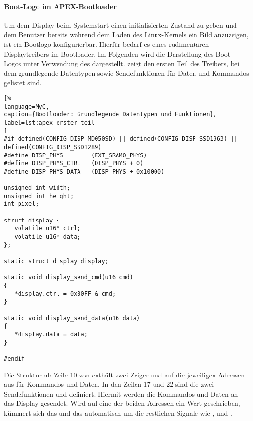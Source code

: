 \paragraph{Boot-Logo im APEX-Bootloader}
\label{cha:bootloader}
Um dem Display beim Systemstart einen initialisierten Zustand zu geben und dem Benutzer bereits während dem Laden des Linux-Kernels ein Bild anzuzeigen, ist ein Bootlogo konfigurierbar. Hierfür bedarf es eines rudimentären Displaytreibers im Bootloader. Im Folgenden wird die Darstellung des Boot-Logos unter Verwendung des  dargestellt.  zeigt den ersten Teil des Treibers, bei dem grundlegende Datentypen sowie Sendefunktionen für Daten und Kommandos gelistet sind. 

\begin{lstlisting}[%
language=MyC,
caption={Bootloader: Grundlegende Datentypen und Funktionen},
label=lst:apex_erster_teil
]
#if defined(CONFIG_DISP_MD050SD) || defined(CONFIG_DISP_SSD1963) || defined(CONFIG_DISP_SSD1289)
#define DISP_PHYS        (EXT_SRAM0_PHYS)
#define DISP_PHYS_CTRL   (DISP_PHYS + 0)
#define DISP_PHYS_DATA   (DISP_PHYS + 0x10000)

unsigned int width;
unsigned int height;
int pixel;

struct display {
   volatile u16* ctrl;
   volatile u16* data;
};

static struct display display;

static void display_send_cmd(u16 cmd)
{
   *display.ctrl = 0x00FF & cmd;
}

static void display_send_data(u16 data)
{
   *display.data = data;
}

#endif
\end{lstlisting}

Die Struktur  ab Zeile 10 von  enthält zwei Zeiger  und  auf die jeweiligen Adressen aus  für Kommandos und Daten. In den Zeilen 17 und 22 sind die zwei Sendefunktionen  und 
 definiert. Hiermit werden die Kommandos und Daten an das Display gesendet. Wird auf eine der beiden Adressen ein Wert geschrieben, kümmert sich das  und das  automatisch um die restlichen Signale wie ,  und . 

